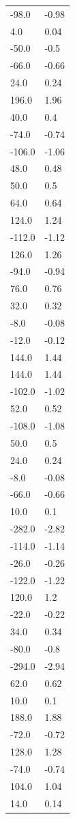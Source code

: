 \begin{longtable}{ll}
-98.0 & -0.98 \\
4.0 & 0.04 \\
-50.0 & -0.5 \\
-66.0 & -0.66 \\
24.0 & 0.24 \\
196.0 & 1.96 \\
40.0 & 0.4 \\
-74.0 & -0.74 \\
-106.0 & -1.06 \\
48.0 & 0.48 \\
50.0 & 0.5 \\
64.0 & 0.64 \\
124.0 & 1.24 \\
-112.0 & -1.12 \\
126.0 & 1.26 \\
-94.0 & -0.94 \\
76.0 & 0.76 \\
32.0 & 0.32 \\
-8.0 & -0.08 \\
-12.0 & -0.12 \\
144.0 & 1.44 \\
144.0 & 1.44 \\
-102.0 & -1.02 \\
52.0 & 0.52 \\
-108.0 & -1.08 \\
50.0 & 0.5 \\
24.0 & 0.24 \\
-8.0 & -0.08 \\
-66.0 & -0.66 \\
10.0 & 0.1 \\
-282.0 & -2.82 \\
-114.0 & -1.14 \\
-26.0 & -0.26 \\
-122.0 & -1.22 \\
120.0 & 1.2 \\
-22.0 & -0.22 \\
34.0 & 0.34 \\
-80.0 & -0.8 \\
-294.0 & -2.94 \\
62.0 & 0.62 \\
10.0 & 0.1 \\
188.0 & 1.88 \\
-72.0 & -0.72 \\
128.0 & 1.28 \\
-74.0 & -0.74 \\
104.0 & 1.04 \\
14.0 & 0.14 \\

\end{longtable}
